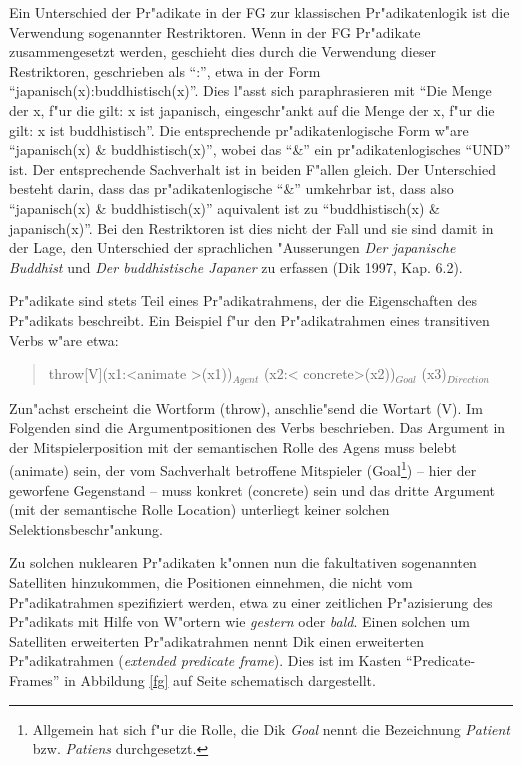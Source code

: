 \documentclass[a4paper]{article}
\begin{document}
Ein Unterschied der Pr"adikate in der FG zur klassischen Pr"adikatenlogik ist
die Verwendung sogenannter Restriktoren. Wenn in der FG Pr"adikate
zusammengesetzt werden, geschieht dies durch die Verwendung dieser
Restriktoren, geschrieben als ``:'', etwa in der Form
``japanisch(x):buddhistisch(x)''. Dies l"asst sich paraphrasieren mit ``Die
Menge der x, f"ur die gilt: x ist japanisch, eingeschr"ankt auf die Menge der
x, f"ur die gilt: x ist buddhistisch''. Die entsprechende pr"adikatenlogische
Form w"are ``japanisch(x) \& buddhistisch(x)'', wobei das ``\&'' ein
pr"adikatenlogisches ``UND'' ist. Der entsprechende Sachverhalt ist in beiden
F"allen gleich. Der Unterschied besteht darin, dass das pr"adikatenlogische
``\&'' umkehrbar ist, dass also ``japanisch(x) \& buddhistisch(x)'' aquivalent
ist zu ``buddhistisch(x) \& japanisch(x)''. Bei den Restriktoren ist dies nicht
der Fall und sie sind damit in der Lage, den Unterschied der sprachlichen
"Ausserungen \emph{Der japanische Buddhist} und \emph{Der buddhistische
Japaner} zu erfassen (Dik 1997, Kap. 6.2).

Pr"adikate sind stets Teil eines Pr"adikatrahmens, der die Eigenschaften des
Pr"adikats beschreibt. Ein Beispiel f"ur den Pr"adikatrahmen eines transitiven
Verbs w"are etwa:

\begin{quote}
throw[V](x1:\textless animate \textgreater (x1))$_{Agent}$ (x2:\textless
concrete\textgreater (x2))$_{Goal}$ (x3)$_{Direction}$
\end{quote}

Zun"achst erscheint die Wortform (throw), anschlie"send die Wortart (V). Im
Folgenden sind die Argumentpositionen des Verbs beschrieben. Das Argument in
der Mitspielerposition mit der semantischen Rolle des Agens muss belebt
(animate) sein, der vom Sachverhalt betroffene Mitspieler
(Goal\footnote{Allgemein hat sich f"ur die Rolle, die Dik \emph{Goal} nennt die
Bezeichnung \emph{Patient} bzw. \emph{Patiens} durchgesetzt.}) -- hier der
geworfene Gegenstand -- muss konkret (concrete) sein und das dritte Argument
(mit der semantische Rolle Location) unterliegt keiner solchen
Selektionsbeschr"ankung.

Zu solchen nuklearen Pr"adikaten k"onnen nun die fakultativen sogenannten
Satelliten hinzukommen, die Positionen einnehmen, die nicht vom Pr"adikatrahmen
spezifiziert werden, etwa zu einer zeitlichen Pr"azisierung des Pr"adikats mit
Hilfe von W"ortern wie \emph{gestern} oder \emph{bald}. Einen solchen um
Satelliten erweiterten Pr"adikatrahmen nennt Dik einen erweiterten
Pr"adikatrahmen (\emph{extended predicate frame}). Dies ist im Kasten
``Predicate-Frames'' in Abbildung \ref{fg} auf Seite \pageref{fg} schematisch
dargestellt.
\end{document}

